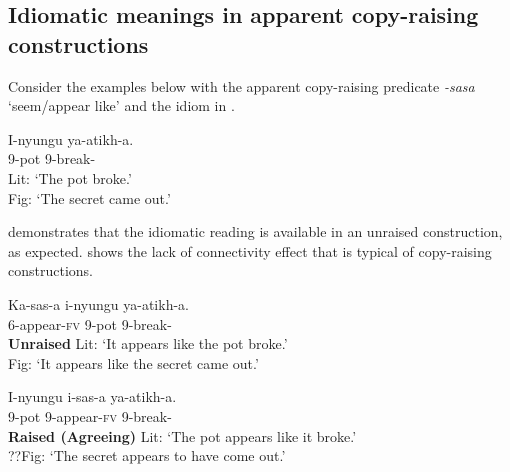 \documentclass[output=paper,colorlinks,citecolor=brown
]{langscibook}
\begin{document}
\subsection{Idiomatic meanings in apparent copy-raising constructions}\label{sec:johnson:CRConnectivity}




Consider the examples below with the apparent copy-raising predicate \textit{-sasa} `seem/appear like' and the idiom in .

\ea\label{ex:johnson:ThePotBroke}
\gll I-nyungu ya-atikh-a.\\
9-pot 9\Sm-break-\Fv{}\\
\glt Lit: `The pot broke.'\\
Fig: `The secret came out.’
\z 

 demonstrates that the idiomatic reading is available in an unraised construction, as expected.  shows the lack of connectivity effect that is typical of copy-raising constructions.

\ea \label{ex:johnson:AgreeingCopyRaisingIdiom}
\begin{xlist}

\ex \label{ex:johnson:AgrCRIdiomA}
\gll Ka-sas-a i-nyungu ya-atikh-a.\\
6\Sm-appear-\textsc{fv} 9-pot 9\Sm-break-\Fv{}\\\hfill\textbf{Unraised}
\glt Lit: `It appears like the pot broke.'\\
Fig: `It appears like the secret came out.’

\ex \label{ex:johnson:AgrCRIdiomB}
\gll I-nyungu i-sas-a ya-atikh-a.\\
9-pot 9\Sm-appear-\textsc{fv} 9\Sm-break-\Fv{}\\\hfill\textbf{Raised (Agreeing)}
\glt Lit: `The pot appears like it broke.'\\
??Fig: `The secret appears to have come out.' %

\end{xlist}
\z 
\end{document}
